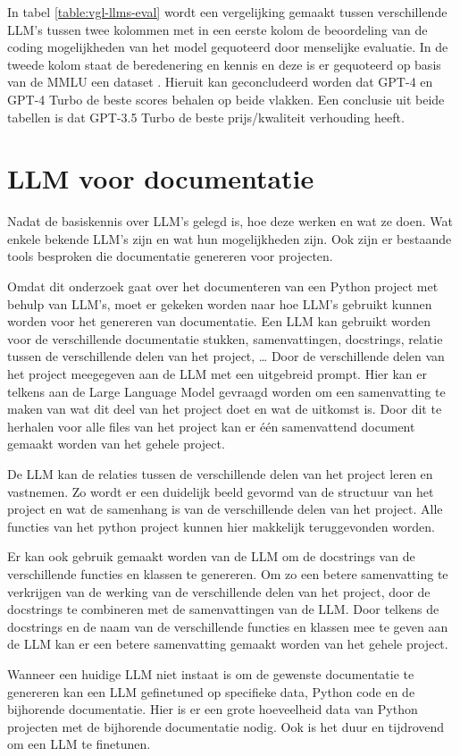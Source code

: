 In tabel \ref{table:vgl-llms-eval} wordt een vergelijking gemaakt tussen verschillende LLM's tussen twee kolommen met in een eerste kolom de beoordeling van de coding mogelijkheden van het model gequoteerd door menselijke evaluatie. 
In de tweede kolom staat de beredenering en kennis en deze is er gequoteerd op basis van de MMLU een dataset \autocite{Hendrycks2020}.
Hieruit kan geconcludeerd worden dat GPT-4 en GPT-4 Turbo de beste scores behalen op beide vlakken.
Een conclusie uit beide tabellen is dat GPT-3.5 Turbo de beste prijs/kwaliteit verhouding heeft.

\section{LLM voor documentatie}
\label{sec:llm-voor-documentatie}

Nadat de basiskennis over LLM's gelegd is, hoe deze werken en wat ze doen. Wat enkele bekende LLM's zijn en wat hun mogelijkheden zijn. 
Ook zijn er bestaande tools besproken die documentatie genereren voor projecten.

Omdat dit onderzoek gaat over het documenteren van een Python project met behulp van LLM's, moet er gekeken worden naar hoe LLM's gebruikt kunnen worden voor het genereren van documentatie.
Een LLM kan gebruikt worden voor de verschillende documentatie stukken, samenvattingen, docstrings, relatie tussen de verschillende delen van het project, \dots
Door de verschillende delen van het project meegegeven aan de LLM met een uitgebreid prompt. 
Hier kan er telkens aan de Large Language Model gevraagd worden om een samenvatting te maken van wat dit deel van het project doet en wat de uitkomst is.
Door dit te herhalen voor alle files van het project kan er één samenvattend document gemaakt worden van het gehele project.

De LLM kan de relaties tussen de verschillende delen van het project leren en vastnemen.
Zo wordt er een duidelijk beeld gevormd van de structuur van het project en wat de samenhang is van de verschillende delen van het project.
Alle functies van het python project kunnen hier makkelijk teruggevonden worden.

Er kan ook gebruik gemaakt worden van de LLM om de docstrings van de verschillende functies en klassen te genereren. 
Om zo een betere samenvatting te verkrijgen van de werking van de verschillende delen van het project, door de docstrings te combineren met de samenvattingen van de LLM.
Door telkens de docstrings en de naam van de verschillende functies en klassen mee te geven aan de LLM kan er een betere samenvatting gemaakt worden van het gehele project.

Wanneer een huidige LLM niet instaat is om de gewenste documentatie te genereren kan een LLM gefinetuned op specifieke data, Python code en de bijhorende documentatie.
Hier is er een grote hoeveelheid data van Python projecten met de bijhorende documentatie nodig. Ook is het duur en tijdrovend om een LLM te finetunen.